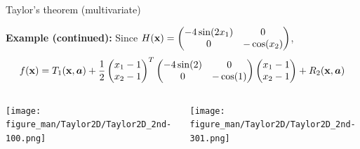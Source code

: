 \documentclass[11pt,compress,t,notes=noshow, xcolor=table]{beamer}
\begin{document}
\begin{vbframe}{Taylor's theorem (multivariate)}
\begin{footnotesize}
    \textbf{Example (continued):} Since $H(\mathbf{x}) = \begin{pmatrix} -4 \sin(2x_1) & 0 \\ 0 & -\cos(x_2) \end{pmatrix}$,
    \begin{equation*}
        f(\mathbf{x}) = T_1(\mathbf{x}, \bm{a}) + \frac{1}{2}\begin{pmatrix}x_1 - 1 \\ x_2 - 1 \end{pmatrix}^T \begin{pmatrix} -4 \sin(2) & 0 \\ 0 & -\cos(1) \end{pmatrix} \begin{pmatrix}x_1 - 1 \\ x_2 - 1 \end{pmatrix} + R_2(\mathbf{x}, \bm{a})
    \end{equation*}
\end{footnotesize}

\vspace*{-0.5\baselineskip}

\begin{columns}
    \begin{column}{0.4\textwidth}
        \texttt{[image: figure\_man/Taylor2D/Taylor2D\_2nd-100.png]}
    \end{column}
    \begin{column}{0.4\textwidth}
        \texttt{[image: figure\_man/Taylor2D/Taylor2D\_2nd-301.png]}
    \end{column}
\end{columns}

\end{vbframe}
\end{document}
